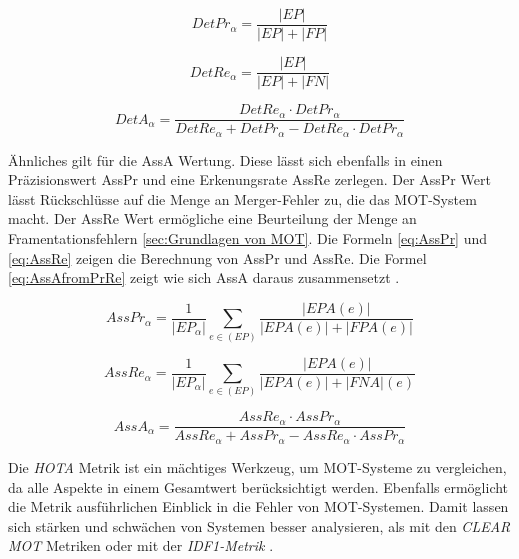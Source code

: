 \begin{equation}
    \label{eq:DetPr}
    DetPr_{\alpha} = \frac{|EP|}{|EP| + |FP|}
\end{equation}

\begin{equation}
    \label{eq:DetRe}
    DetRe_{\alpha} = \frac{|EP|}{|EP| + |FN|}
\end{equation}

\begin{equation}
    \label{eq:DetAfromPrRe}
    DetA_{\alpha} = \frac{DetRe_{\alpha} \cdot DetPr_{\alpha} }{DetRe_{\alpha} + DetPr_{\alpha} - DetRe_{\alpha} \cdot DetPr_{\alpha}}
\end{equation}

Ähnliches gilt für die \gls{AssA} Wertung. Diese lässt sich ebenfalls in einen  Präzisionswert \gls{AssPr} und eine Erkenungsrate \gls{AssRe} zerlegen. Der \gls{AssPr} Wert lässt Rückschlüsse auf die Menge an Merger-Fehler zu, die das \gls{MOT}-System macht. Der \gls{AssRe} Wert ermögliche eine Beurteilung der Menge an Framentationsfehlern \ref{sec:Grundlagen von MOT}. Die Formeln \ref{eq:AssPr} und \ref{eq:AssRe} zeigen die Berechnung von \gls{AssPr} und \gls{AssRe}. Die Formel \ref{eq:AssAfromPrRe} zeigt wie sich \gls{AssA} daraus zusammensetzt \cite{HOTA}. 

\begin{equation}
    \label{eq:AssPr}
    AssPr_{\alpha} =  \frac{1}{|EP_{\alpha}|} \sum_{e \in (EP)} \frac{|EPA(e)|}{|EPA(e)| + |FPA(e)|}
\end{equation}

\begin{equation}
    \label{eq:AssRe}
    AssRe_{\alpha} = \frac{1}{|EP_{\alpha}|} \sum_{e \in (EP)} \frac{|EPA(e)|}{|EPA(e)| + |FNA|(e)}
\end{equation}

\begin{equation}
    \label{eq:AssAfromPrRe}
    AssA_{\alpha} = \frac{AssRe_{\alpha} \cdot AssPr_{\alpha} }{AssRe_{\alpha} + AssPr_{\alpha} - AssRe_{\alpha} \cdot AssPr_{\alpha}}
\end{equation}

Die \textit{\gls{HOTA}} Metrik ist ein mächtiges Werkzeug, um \gls{MOT}-Systeme zu vergleichen, da alle Aspekte in einem Gesamtwert berücksichtigt werden. Ebenfalls ermöglicht die Metrik ausführlichen Einblick in die Fehler von \gls{MOT}-Systemen. Damit lassen sich stärken und schwächen von Systemen besser analysieren, als mit den \textit{\acrshort{CLEAR} \gls{MOT}} Metriken oder mit der \textit{\gls{IDF1}-Metrik} \cite{HOTA}. 